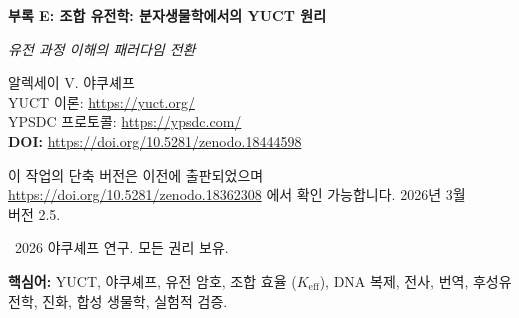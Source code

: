 \documentclass[11pt,a4paper]{article}
\begin{document}
	
	\begin{titlepage}
		\begin{center}
			\vspace*{0cm}
			
			\Huge\textbf{부록 E: 조합 유전학: 분자생물학에서의 YUCT 원리}
			
			\vspace{1cm}
			
			\small\textit{유전 과정 이해의 패러다임 전환}
			
			\vspace{1cm}
			\Large
			알렉세이 V. 야쿠셰프\\
			
			YUCT 이론: \url{https://yuct.org/}\\
			YPSDC 프로토콜: \url{https://ypsdc.com/}\\
			
			\vspace{2cm}
			\textbf{DOI:} \url{https://doi.org/10.5281/zenodo.18444598}\\
			
			\vspace{1cm}
			
			\large 
			이 작업의 단축 버전은 이전에 출판되었으며\\
			\url{https://doi.org/10.5281/zenodo.18362308} 에서 확인 가능합니다.
			\vspace{1cm}
			2026년 3월 \\ \large 버전 2.5.
			
			\vspace{4cm}
			\textcopyright~2026 야쿠셰프 연구. 모든 권리 보유.
			
			\newpage	
			\begin{abstract}
				\noindent
				이 연구는 야쿠셰프의 조합 원리를 통해 유전 과정을 근본적으로 재해석합니다. 우리는 유전 암호, DNA 복제, 유전자 발현, 진화가 측정 가능한 효율 \(K_{\text{eff}}\)를 갖는 조합 과정임을 보여줍니다. 이전에 설명되지 않은 현상을 예측하고 프로그래밍 가능한 진화로 가는 길을 여는 새로운 수학적 모델이 도입됩니다. 이 이론은 단순한 실험실 테스트에서 복잡한 유전 공학 프로젝트에 이르기까지 여러 실험 영역에서 검증 가능한 예측을 제공합니다.
			\end{abstract}
			
			\vspace{0cm}
			
			\noindent
			\textbf{핵심어:} YUCT, 야쿠셰프, 유전 암호, 조합 효율 (\(K_{\text{eff}}\)), DNA 복제, 전사, 번역, 후성유전학, 진화, 합성 생물학, 실험적 검증.
			
			\vspace{0.5cm}
			
		\end{center}
	\end{titlepage}
	
\end{document}
